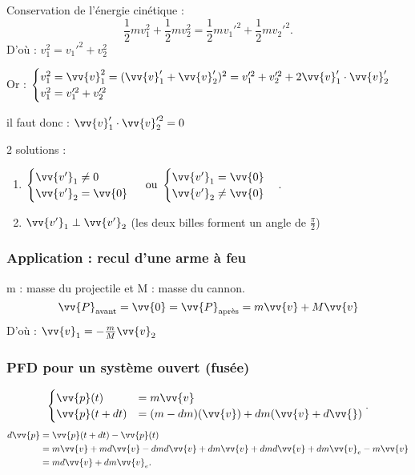 Conservation de l'énergie cinétique : 
\[
\frac{1}{2}mv_1^2 + \frac{1}{2} mv_2^2 = \frac{1}{2}mv_1'^2 + \frac{1}{2}mv_2'^2
.\] 
D'où : \(v_1^2 = v_1'^2 + v_2^2 \) \par
Or : \(\begin{cases}
    v_1^2 = \vv{v}_1^2 = (\vv{v}_1' + \vv{v}_2')^2 = v_1'^2 + v_2'^2 + 2\vv{v}_1' \cdot \vv{v}_2'\\
    v_1^2 = v_1'^2 + v_2'^2
\end{cases} \) \par
il faut donc : \(\vv{v}_1' \cdot \vv{v}_2'^2 = 0\) \par
2 solutions : 
\begin{enumerate}
    \item \(
    \begin{cases}
        \vv{v'}_1 \neq 0 \\ \vv{v'}_2 = \vv{0}
    \end{cases} \text{ ou } \begin{cases}
        \vv{v'}_1 = \vv{0}\\ \vv{v'}_2 \neq \vv{0}
    \end{cases}
    .\)
    \item \(\vv{v'}_1 \perp \vv{v'}_2\) (les deux billes forment un angle de $\frac{\pi}{2}$)
\end{enumerate}

\subsubsection{Application : recul d'une arme à feu}

m : masse du projectile et M : masse du cannon. 
\[
    \vv{P}_{\text{avant}} = \vv{0} = \vv{P}_{\text{après}} = m\vv{v} + M\vv{v}
\]
D'où : \(\vv{v}_1 = -\frac{m}{M}\vv{v}_2\)

\subsubsection{PFD pour un système ouvert (fusée)}


\[
\begin{cases}
    \vv{p}(t) &= m\vv{v}  \\
    \vv{p}(t+dt)&= (m-dm)(\vv{v}) + dm(\vv{v}+d\vv{}) \\
\end{cases}
.\] 
\begin{align*}
    d\vv{p} &= \vv{p}(t+dt) -\vv{p}(t) \\
    &= m\vv{v} + md\vv{v} -dmd\vv{v} + dm\vv{v} + dmd\vv{v} + dm\vv{v}_e - m\vv{v} \\
    &= md\vv{v} + dm\vv{v}_e
.\end{align*}

